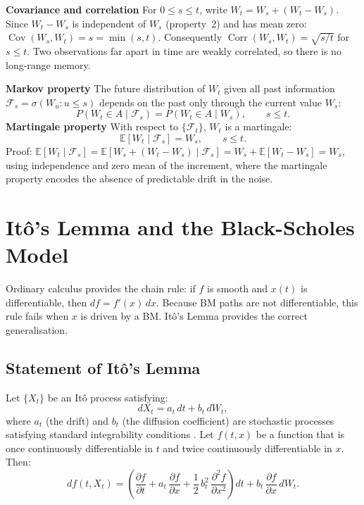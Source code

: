 \textbf{Covariance and correlation} For $0 \leq s \leq t$, write
$W_t = W_s + (W_t - W_s)$. Since $W_t - W_s$ is independent of $W_s$ (property~2) and has mean zero: \(\operatorname{Cov}(W_s, W_t)=s=\min(s,t)\). Consequently $\operatorname{Corr}(W_s, W_t) = \sqrt{s/t}$ for $s \leq t$.
Two observations far apart in time are weakly correlated, so there is no long-range memory.

\textbf{Markov property} The future distribution of $W_t$ given all past
information $\mathcal{F}_s = \sigma(W_u : u \leq s)$ depends on the past only
through the current value $W_s$:
\[
    P(W_t \in A \mid \mathcal{F}_s) = P(W_t \in A \mid W_s), \qquad s \leq t.
\]
\textbf{Martingale property} With respect to $\{\mathcal{F}_t\}$, $W_t$ is a
martingale:
\[
    \mathbb{E}[W_t \mid \mathcal{F}_s] = W_s, \qquad s \leq t.
\]
Proof: $\mathbb{E}[W_t \mid \mathcal{F}_s] = \mathbb{E}[W_s + (W_t - W_s)
\mid \mathcal{F}_s] = W_s + \mathbb{E}[W_t - W_s] = W_s$, using independence
and zero mean of the increment, where the martingale property encodes the absence of predictable drift in the noise.

\section{It\^{o}'s Lemma and the Black-Scholes Model}
\label{app:sec:ito}

Ordinary calculus provides the chain rule: if $f$ is smooth and $x(t)$ is
differentiable, then $df = f'(x)\,dx$. Because BM paths are not differentiable,
this rule fails when $x$ is driven by a BM. It\^{o}'s Lemma provides the correct generalisation.

\subsection{Statement of It\^{o}'s Lemma}

Let $\{X_t\}$ be an It\^{o} process satisfying:
\[
    dX_t = a_t\, dt + b_t\, dW_t,
\]
where $a_t$ (the drift) and $b_t$ (the diffusion coefficient) are stochastic processes satisfying standard integrability conditions
\cite{oksendal2003stochastic}. Let $f(t, x)$ be a function that is once
continuously differentiable in $t$ and twice continuously differentiable in $x$.
Then:
\[
    \label{eq:ito_lemma}
    df(t, X_t) = \left(\frac{\partial f}{\partial t}
    + a_t\, \frac{\partial f}{\partial x}
    + \frac{1}{2}\, b_t^2\,
    \frac{\partial^2 f}{\partial x^2}\right)\! dt
    + b_t\, \frac{\partial f}{\partial x}\, dW_t.
\]

